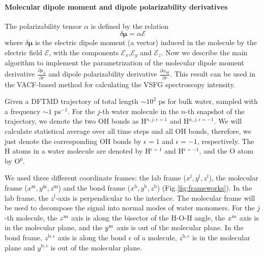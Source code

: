\paragraph{Molecular dipole moment and dipole polarizability derivatives} \label{calculate_derivatives} 

The polarizability tensor $\alpha$ is defined by the relation
\begin{equation}
  \delta \boldsymbol{\mu} = {\alpha} \boldsymbol{\mathscr{E}}
  \label{eq:def_alpha}
\end{equation}
where $\delta \boldsymbol{\mu}$ is the electric dipole moment (a vector) induced in the molecule by
the electric field $\boldsymbol{\mathscr{E}}$, with the components $\mathscr{E}_x$,$\mathscr{E}_y$ and $\mathscr{E}_z$.
Now we describe the main algorithm to implement the parametrization of the molecular dipole moment 
derivative $\frac{\partial \mu_k}{\partial r}$ and dipole polarizability derivative $\frac{\partial\alpha_{\eta\xi}}{\partial r}$. 
This result can be used in the VACF-based method for calculating the VSFG spectroscopy intensity.

Given a DFTMD trajectory of total length $\sim 10^2$ ps for bulk water, sampled with a frequency $\sim 1$ ps$^{-1}$.
For the $j$-th water molecule in the $n$-th snapshot of the trajectory, 
we denote the two OH bonds as H$^{n,j,\epsilon=1}$ and H$^{n,j,\epsilon=-1}$. We will calculate statistical average over all time steps and all OH bonds, therefore, 
we just denote the corresponding OH bonds by ${\epsilon=1}$ and ${\epsilon=-1}$, respectively. 
The H atoms in a water molecule are denoted by H$^{\epsilon=1}$ and H$^{\epsilon=-1}$, and the O atom by O$^{0}$.

We used three different coordinate frames: the lab frame ($x^{\text{l}},y^{\text{l}},z^{\text{l}}$), the molecular frame
($x^{\text{m}},y^{\text{m}},z^{\text{m}}$) and the bond frame ($x^{\text{b}},y^{\text{b}},z^{\text{b}}$) (Fig.\thinspace\ref{fig:frameworks}).
In the lab frame, the $z^{\text{l}}$-axis is perpendicular to the interface.
The molecular frame will be used to decompose the signal into normal modes of water monomers.
For the $j$-th molecule, the $z^{\text m}$ axis is along the bisector of the H-O-H angle, the $x^{\text m}$ axis is in the molecular plane,
and the $y^{\text m}$ axis is out of the molecular plane. 
In the bond frame, $z^{\text{b},\epsilon}$ axis is along the bond $\epsilon$ of a molecule, $z^{\text{b},\epsilon}$
is in the molecular plane and $y^{\text{b},\epsilon}$ is out of the molecular plane.

